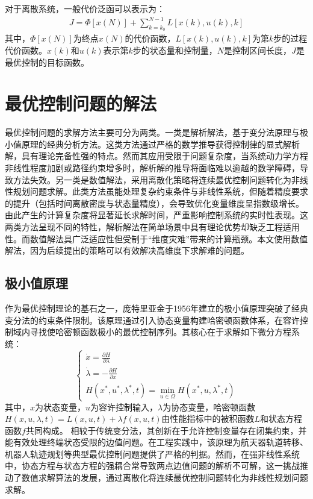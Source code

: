\documentclass[master,academic]{ysuthesis} %
\begin{document}
	对于离散系统，一般代价泛函可以表示为：
	\begin{equation}
		\begin{aligned}
			J = \Phi[x(N)]+\sum_{k=k_0}^{N-1}L[x(k),u(k),k]
		\end{aligned}
	\end{equation}
	其中，$\Phi[x(N)]$为终点$x(N)$的代价函数，$L[x(k),u(k),k]$为第$k$步的过程代价函数。$x(k)$和$u(k)$表示第$k$步的状态量和控制量，$N$是控制区间长度，$J$是最优控制的目标函数。

	\section{最优控制问题的解法}
	最优控制问题的求解方法主要可分为两类。一类是解析解法，基于变分法原理与极小值原理的经典分析方法。这类方法通过严格的数学推导获得控制律的显式解析解，具有理论完备性强的特点。然而其应用受限于问题复杂度，当系统动力学方程非线性程度加剧或路径约束增多时，解析解的推导将面临难以逾越的数学障碍，导致方法失效。另一类是数值解法，采用离散化策略将连续最优控制问题转化为非线性规划问题求解。此类方法虽能处理复杂约束条件与非线性系统，但随着精度要求的提升（包括时间离散密度与状态量精度），会导致优化变量维度呈指数级增长。由此产生的计算复杂度将显著延长求解时间，严重影响控制系统的实时性表现。这两类方法呈现不同的特性，解析解法在简单场景中具有理论优势却缺乏工程适用性。而数值解法具广泛适应性但受制于“维度灾难”带来的计算瓶颈。本文使用数值解法，因为后续提出的策略可以有效解决高维度下求解难的问题。
	\subsection{极小值原理}
	作为最优控制理论的基石之一，庞特里亚金于1956年建立的极小值原理突破了经典变分法的约束条件限制。该原理通过引入协态变量构建哈密顿函数体系，在容许控制域内寻找使哈密顿函数极小的最优控制序列。其核心在于求解如下微分方程系统：
	\begin{equation}
		\begin{cases}
		\dot{x} = \frac{\partial H}{\partial \lambda} \\
		\dot{\lambda} = -\frac{\partial H}{\partial x} \\
		H(x^*,u^*,\lambda^*,t) = \min_{u \in \Omega} H(x^*,u,\lambda^*,t) 
		\end{cases}
	\end{equation}
	其中，$x$为状态变量，$u$为容许控制输入，$\lambda$为协态变量，哈密顿函数$H(x,u,\lambda,t)=L(x,u,t)+\lambda f(x,u,t)$由性能指标中的被积函数$L$和状态方程函数$f$共同构成。
	相较于传统变分法，其创新在于允许控制变量存在闭集约束，并能有效处理终端状态受限的边值问题。在工程实践中，该原理为航天器轨道转移、机器人轨迹规划等典型最优控制问题提供了严格的判据。然而，在强非线性系统中，协态方程与状态方程的强耦合常导致两点边值问题的解析不可解，这一挑战推动了数值求解算法的发展，通过离散化将连续最优控制问题转化为非线性规划问题求解。
	
\end{document}
